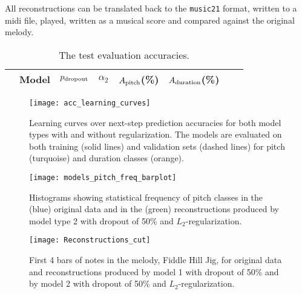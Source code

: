 All reconstructions can be translated back to the \texttt{music21} format, written to a midi file, played, written as a musical score and compared against the original melody.

\begin{table}
    \centering
    \caption{
        The test evaluation accuracies.
    }
    \label{tab:test_eval}
    \begin{tabular}{
            l@{}
            S[table-format = 1.0]
            S[table-format = 0.2]
            S[table-format = 1.0]
            S[table-format = 1.3]
            S[table-format = 1.3]
            S[table-format = 2.2]
            S[table-format = 2.2]
        }
        \toprule
        & {Model} 
        & {$p_{\text{dropout}}$}
        & {$\alpha_2$}
        & {$A_{\text{pitch}}$(\%)}
        & {$A_{\text{duration}}$(\%)} \\
        \midrule
        
        \bottomrule
    \end{tabular}
\end{table}

\begin{figure*}
    \centering
    \texttt{[image: acc\_learning\_curves]}
    \caption{Learning curves over next-step prediction accuracies for both model types with and without regularization. The models are evaluated on both training (solid lines) and validation sets (dashed lines) for pitch (turquoise) and duration classes (orange).}
    \label{fig:learning_curves}
\end{figure*}

\begin{figure*}
    \centering
    \texttt{[image: models\_pitch\_freq\_barplot]}
    \caption{Histograms showing statistical frequency of pitch classes in the (blue) original data and in the (green) reconstructions produced by model type 2 with dropout of 50\% and $L_2$-regularization.}
    \label{fig:histogram}
\end{figure*}

\begin{figure*}
    \centering
    \texttt{[image: Reconstructions\_cut]}
    \caption{First 4 bars of notes in the melody, Fiddle Hill Jig, for original data and reconstructions produced by model 1 with dropout of 50\% and by model 2 with dropout of 50\% and $L_2$-regularization.}
    \label{fig:reconstructions}
\end{figure*}
